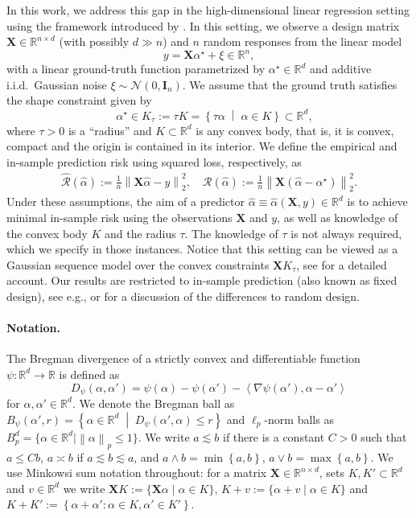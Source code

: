\documentclass[a4paper]{article}
\newcommand{\mathset}[1]{\left\{#1\right\}}
\newcommand{\norm}[1]{\left\|#1\right\|}
\newcommand{\setmid}[0]{\;\middle|\;}
\newcommand{\inner}[2]{\left\langle #1,#2\right\rangle}
\newcommand{\I}[0]{\mathbf{I}}
\newcommand{\X}[0]{\mathbf{X}}
\newcommand{\RR}[0]{\mathbb{R}}
\newcommand{\cN}[0]{\mathcal{N}}
\newcommand{\cR}[0]{\mathcal{R}}
\newcommand{\ha}[0]{\widehat{\alpha}}
\newcommand{\alphastar}{\alpha^\star}
\newcommand{\Kt}[0]{K_\tau}
\newcommand{\Rhat}[0]{\widehat{\cR}}
\theoremstyle{thmstyle}
\theoremstyle{defstyle}
\theoremstyle{remark}
\begin{document}
In this work, we address this gap in the high-dimensional linear regression setting using the framework introduced by \cite{Kanade2023earlystopped}. In this setting, we observe a design matrix $\X\in\RR^{n\times d}$ (with possibly $d \gg n$) and $n$ random responses from the linear model
\begin{equation}
    y=\X\alphastar+\xi\in \RR^n,
\end{equation}
with a linear ground-truth function parametrized by $\alphastar\in \RR^d$ and additive i.i.d.\ Gaussian noise $\xi\sim \cN(0,\I_{n})$.
We assume that the ground truth satisfies the shape constraint given by
\begin{equation}
\label{eq:convex-body}
    \quad \alphastar \in K_\tau := \tau K=\mathset{\tau\alpha\setmid \alpha\in K}\subset\RR^d,
\end{equation}
where $\tau>0$ is a ``radius'' and $K\subset\RR^d$ is any convex body, that is, it is convex, compact and the origin is contained in its interior.
We define the empirical and in-sample prediction risk using squared loss, respectively, as
\begin{align*}
     \Rhat(\ha):=\frac{1}{n}\norm{\X\ha-y}_2^2, 
     \quad \cR(\ha):= \frac{1}{n}\norm{\X(\ha-\alphastar)}_2^2.
\end{align*}
Under these assumptions, the aim of a predictor $\ha\equiv \ha(\X,y)\in\RR^d$ is to achieve minimal in-sample risk using the observations $\X$ and $y$, as well as knowledge of the convex body $K$ and the radius $\tau$. The knowledge of $\tau$ is not always required, which we specify in those instances. Notice that this setting can be viewed as a Gaussian sequence model over the convex constraints $\X \Kt$, see \citet{johnstone2017gaussian} for a detailed account.
Our results are restricted to in-sample prediction (also known as fixed design), see e.g., \citet[Sec. 14.1]{Wainwright2019} or \citet[Chp. 3]{bach2024learning} for a discussion of the differences to random design.


\paragraph{Notation.} The Bregman divergence of a strictly convex and differentiable function $\psi:\RR^d\to\RR$ is defined as 
$$D_\psi(\alpha,\alpha')=\psi(\alpha)-\psi(\alpha')-\inner{\nabla\psi(\alpha')}{\alpha-\alpha'}$$
for $\alpha,\alpha'\in\RR^d$.
We denote the Bregman ball as $B_\psi(\alpha',r)=\mathset{\alpha\in\RR^d\setmid D_\psi(\alpha',\alpha)\leq r}$
and $\ell_p$-norm balls as $B_p^d=\{\alpha\in\RR^d | \norm{\alpha}_p\leq 1\}$.
We write $a\lesssim b$ if there is a constant $C>0$ such that $a\leq Cb$, $a\asymp b$ if $a\lesssim b \lesssim a$, and $a\wedge b=\min\mathset{a,b}$, $a\vee b=\max\mathset{a,b}$. We use Minkowsi sum notation throughout: for a matrix $\X\in\RR^{n\times d}$, sets $K,K'\subset \RR^d$ and $v\in\RR^d$ we write $\X K:= \{\X\alpha\mid \alpha\in K\}$, $K+v := \{\alpha+v \mid \alpha\in K\}$ and $K+K':=\mathset{\alpha+\alpha':\alpha\in K, \alpha'\in K'}$.
\end{document}
